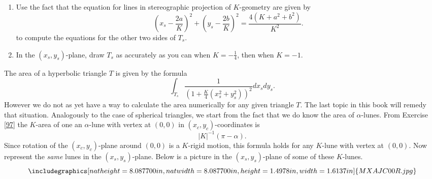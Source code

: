 \documentclass{ximera}
\begin{document}
\begin{exercise}\hfil
\begin{enumerate}
\item Use the fact that the equation for lines in stereographic
  projection of $K$-geometry are given by
\[
\left(  x_{s}-\frac{2a}{K}\right)  ^{2}+\left(  y_{s}-\frac{2b}{K}\right)
^{2}=\frac{4\left(  K+a^{2}+b^{2}\right)  }{K^{2}}.
\]
to compute the equations for the other two sides of $T_{s}$.

\item In the $\left( x_{s},y_{s}\right) $-plane, draw $T_{s}$ as
  accurately as you can when $K=-\frac{1}{4}$, then when $K=-1$.
\end{enumerate}
\end{exercise}

The area of a hyperbolic triangle $T$ is given by the formula%
\[%
{\displaystyle\int\nolimits_{T_{s}}}
\frac{1}{\left(  1+\frac{K}{4}\left(  x_{s}^{2}+y_{s}^{2}\right)  \right)
^{2}}dx_{s}dy_{s}.
\]
However we do not as yet have a way to calculate the area numerically for any
given triangle $T$. The last topic in this book will remedy that situation.
Analogously to the case of spherical triangles, we start from the fact that we
do know the area of $\alpha$-lunes. From Exercise \ref{97} the $K$-area of one
an $\alpha$-lune with vertex at $\left(  0,0\right)  $ in $\left(  x_{c}%
,y_{c}\right)  $-coordinates is%
\[
\left\vert K\right\vert ^{-1}\left(  \pi-\alpha\right)  .
\]
Since rotation of the $\left(  x_{c},y_{c}\right)  $-plane around $\left(
0,0\right)  $ is a $K$-rigid motion, this formula holds for any $K$-lune with
vertex at $\left(  0,0\right)  $. Now represent the \textit{same} lunes in the
$\left(  x_{s},y_{s}\right)  $-plane. Below is a picture in the $\left(
x_{s},y_{s}\right)  $-plane of some of these $K$-lunes.%
\begin{equation}%
{\includegraphics[
natheight=8.087700in,
natwidth=8.087700in,
height=1.4978in,
width=1.6137in
]%
{MXAJC00R.jpg}%
}%
\label{98}%
\end{equation}
\end{document}
